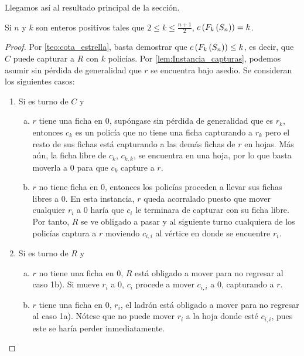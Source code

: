 Llegamos as\'i al resultado principal de la secci\'on.

\begin{teorema}
\label{teo:numero-de-policia-estrella}
    Si $n$ y $k$ son enteros positivos tales que $2\leq k \leq \frac{n+1}{2}$,
    $c\left( F_{k}\left( S_{n}\right)\right)=k$.
\end{teorema}

\begin{proof}
    Por \cref{teo:cota_estrella}, basta demostrar que $c\left( F_{k}\left( S_n\right)\right) \leq
    k$, es decir, que $C$ puede capturar a $R$ con $k$ polic\'ias. Por
    \cref{lem:Instancia_capturas}, podemos asumir sin p\'erdida de generalidad
    que $r$ se encuentra bajo asedio. Se consideran los siguientes casos:
    \begin{enumerate}
        \item Si es turno de $C$ y
        \begin{enumerate}[a)]
            \item $r$ tiene una ficha en $0$, sup\'ongase sin p\'erdida de
            generalidad que es $r_k$, entonces $c_k$ es un polic\'ia que no
            tiene una ficha capturando a $r_k$ pero el resto de sus fichas
            est\'a capturando a las dem\'as fichas de $r$ en hojas. M\'as a\'un,
            la ficha libre de $c_k$, $c_{k,k}$, se encuentra en una hoja, por lo
            que basta moverla a $0$ para que $c_k$ capture a $r$.

            \item $r$ no tiene ficha en $0$, entonces los polic\'ias proceden a
            llevar sus fichas libres a $0$. En esta instancia, $r$ queda
            acorralado puesto que mover cualquier $r_i$ a $0$ har\'ia que $c_i$
            le terminara de capturar con su ficha libre. Por tanto, $R$ se ve
            obligado a pasar y al siguiente turno cualquiera de los polic\'ias
            captura a $r$ moviendo $c_{i,i}$ al v\'ertice en donde se encuentre
            $r_i$.
        \end{enumerate}

        \item Si es turno de $R$ y
        \begin{enumerate}[a)]
            \item $r$ no tiene una ficha en $0$, $R$ est\'a obligado a mover
            para no regresar al caso 1b). Si mueve $r_i$ a $0$, $c_i$ procede a
            mover $c_{i,i}$ a $0$, capturando a $r$.
            
            \item $r$ tiene una ficha en $0$, $r_i$, el ladr\'on est\'a obligado
            a mover para no regresar al caso 1a). N\'otese que no puede mover
            $r_i$ a la hoja donde est\'e $c_{i,i}$, pues este se har\'ia perder
            inmediatamente.
            

\end{enumerate}
\end{enumerate}
\end{proof}

